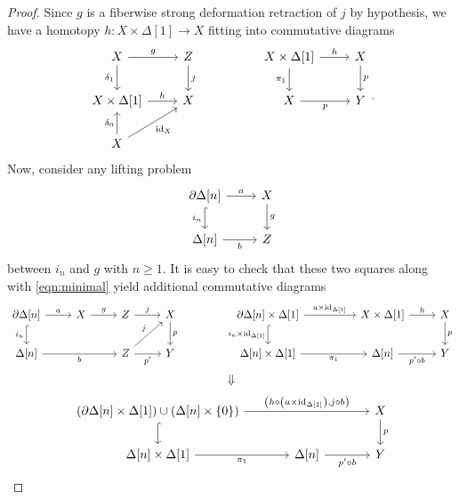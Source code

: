\documentclass[10pt,letterpaper,cm]{nupset}
\theoremstyle{definition}
\theoremstyle{theorem}
\theoremstyle{remark}
\newcommand{\0}{\mathbf{0}}
\newcommand{\1}{\mathbf{1}}
\newcommand{\2}{\mathbf{2}}
\DeclareMathOperator{\idd}{id}
\begin{document}
\begin{proof}
Since $g$ is a fiberwise strong deformation retraction of $j$ by hypothesis, we have a homotopy $h:  X\times \Delta[1] \to X$ fitting into commutative diagrams
\[
\begin{tikzcd}
X \arrow[d, "\delta_1"'] \arrow[r, "g"]            & Z \arrow[d, "j"] &  & {X\times \Delta[1]} \arrow[r, "h"] \arrow[d, "\pi_1"'] & X \arrow[d, "p"] \\
{X\times \Delta[1]} \arrow[r, "h"]            & X                &  & X \arrow[r, "p"']                                      & Y                \\
X \arrow[u, "\delta_0"] \arrow[ru, "\idd_X"'] &                  &  &                                                        &                 
\end{tikzcd}
.\] Now, consider any lifting problem
\[
\begin{tikzcd}
{\partial{\Delta[n]}} \arrow[d, "i_n"', hook] \arrow[r, "a"] & X \arrow[d, "g"] \\
\Delta[n] \arrow[r, "b"']                                     & Z               
\end{tikzcd}
\] between $i_n$ and $g$ with $n\geq 1$. It is easy to check that these two squares along with \eqref{eqn:minimal} yield additional commutative diagrams
\[
\begin{tikzcd}
{\partial{\Delta[n]}} \arrow[r, "a"] \arrow[d, "i_n"', hook] & X \arrow[r, "g"] & Z \arrow[r, "j"]                   & X \arrow[d, "p"] &  & {\partial{\Delta[n]}\times \Delta[1]} \arrow[d, "{i_n\times \idd_{\Delta[1]}}"', hook] \arrow[rr, "{a\times \idd_{\Delta[1]}}"] &  & {X\times \Delta[1]} \arrow[r, "h"]   & X \arrow[d, "p"] \\
{\Delta[n]} \arrow[rr, "b"']                                 &                  & Z \arrow[ru, "j"] \arrow[r, "p'"'] & Y                &  & {\Delta[n]\times \Delta[1]} \arrow[rr, "\pi_1"']                                                                                &  & {\Delta[n]} \arrow[r, "p' \circ b"'] & Y               
\end{tikzcd}
\]
\[
\Downarrow
\]
\[
\begin{tikzcd}[column sep=large]
{\mleft(\partial{\Delta[n]}\times \Delta[1]\mright)\cup \mleft(\Delta[n]\times \mleft\{0\mright\}\mright)} \arrow[rr, "{\mleft(h \circ \mleft(a\times \idd_{\Delta[1]}\mright), j\circ b \mright)}"] \arrow[d, hook] &                                     & X \arrow[d, "p"] \\
{\Delta[n]\times \Delta[1]} \arrow[r, "\pi_1"']                                                                                                                                                     & {\Delta[n]} \arrow[r, "p'\circ b"'] & Y               

\end{tikzcd}\]
\end{proof}
\end{document}
